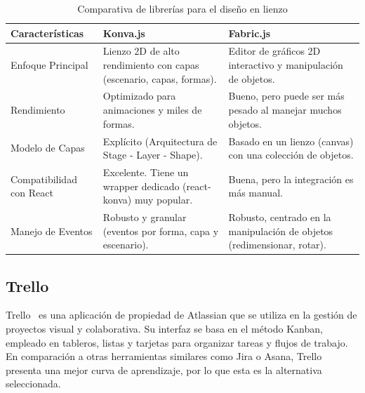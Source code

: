 ﻿\documentclass{iccmemoria}
\begin{document}
\begin{table}[H]
    \centering    
    \caption{Comparativa de librerías para el diseño en lienzo}
    \label{tab:comparativa_librería} %
    \begin{tabular}{|p{3.5cm}|p{5cm}|p{5cm}|} 
        \hline %
        \textbf{Características} & \textbf{Konva.js} & \textbf{Fabric.js}\\
        \hline %
        Enfoque Principal & Lienzo 2D de alto rendimiento con capas (escenario, capas, formas). & Editor de gráficos 2D interactivo y manipulación de objetos. \\
        \hline
        Rendimiento & Optimizado para animaciones y miles de formas. & Bueno, pero puede ser más pesado al manejar muchos objetos.\\
        \hline
        Modelo de Capas & Explícito (Arquitectura de Stage - Layer - Shape). & Basado en un lienzo (canvas) con una colección de objetos. \\
        \hline
        Compatibilidad con React & Excelente. Tiene un wrapper dedicado (react-konva) muy popular. & Buena, pero la integración es más manual. \\
        \hline
        Manejo de Eventos & Robusto y granular (eventos por forma, capa y escenario). & Robusto, centrado en la manipulación de objetos (redimensionar, rotar). \\        
        \hline %
    \end{tabular}
\end{table}
\subsection{Trello}
Trello~\cite{trello} es una aplicación de propiedad de Atlassian que se utiliza en la gestión de proyectos visual y colaborativa. Su interfaz se basa en el método Kanban, empleado en tableros, listas y tarjetas para organizar tareas y flujos de trabajo.\\
En comparación a otras herramientas similares como Jira o Asana, Trello presenta una mejor curva de aprendizaje, por lo que esta es la alternativa seleccionada.
\end{document}
